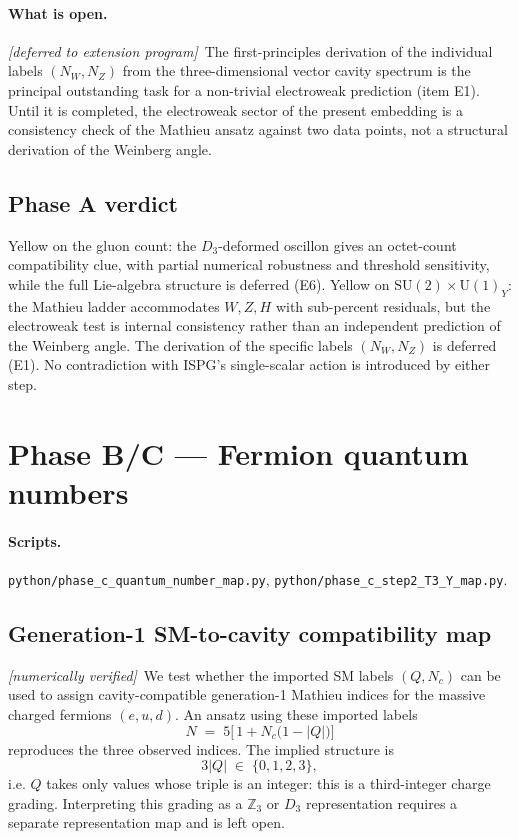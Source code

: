 \documentclass[11pt]{article}
\newcommand{\numerical}{\textit{[numerically verified]}}
\newcommand{\deferred}{\textit{[deferred to extension program]}}
\begin{document}
\paragraph{What is open.} \deferred\ The first-principles
derivation of the individual labels $(N_W,N_Z)$ from the
three-dimensional vector cavity spectrum is the principal
outstanding task for a non-trivial electroweak prediction
(item E1). Until it is completed, the electroweak sector of
the present embedding is a consistency check of the Mathieu
ansatz against two data points, not a structural derivation
of the Weinberg angle.

\subsection{Phase A verdict}

Yellow on the gluon count: the $D_3$-deformed oscillon gives an
octet-count compatibility clue, with partial numerical robustness
and threshold sensitivity, while the full Lie-algebra structure is
deferred (E6). Yellow on
$\mathrm{SU}(2)\times\mathrm{U}(1)_Y$: the Mathieu ladder
accommodates $W,Z,H$ with sub-percent residuals, but the
electroweak test is internal consistency rather than an
independent prediction of the Weinberg angle. The derivation of the
specific labels $(N_W,N_Z)$ is deferred (E1). No contradiction
with ISPG's single-scalar action is introduced by either step.

\section{Phase B/C --- Fermion quantum numbers}
\label{sec:phaseBC}

\paragraph{Scripts.} \texttt{python/phase\_c\_quantum\_number\_map.py},
\texttt{python/phase\_c\_step2\_T3\_Y\_map.py}.

\subsection{Generation-1 SM-to-cavity compatibility map}
\label{sec:phaseC_gen1}

\numerical\ We test whether the imported SM labels $(Q,N_c)$
can be used to assign cavity-compatible generation-1 Mathieu
indices for the massive charged fermions $(e,u,d)$. An ansatz
using these imported labels
\begin{equation}
  \label{eq:gen1formula}
  N \;=\; 5\bigl[\,1 + N_c\bigl(1 - |Q|\bigr)\bigr]
\end{equation}
reproduces the three observed indices. The implied structure is
\begin{equation}
  3|Q| \;\in\;\{0,1,2,3\},
\end{equation}
i.e. $Q$ takes only values whose triple is an integer: this is a
third-integer charge grading. Interpreting this grading as a
$\mathbb{Z}_3$ or $D_3$ representation requires a separate
representation map and is left open.
\end{document}
